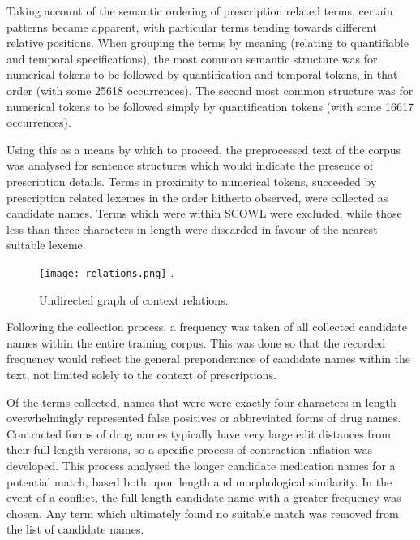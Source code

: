 Taking account of the semantic ordering of prescription related terms, certain patterns became apparent, with particular terms tending towards different relative positions. When grouping the terms by meaning (relating to quantifiable and temporal specifications), the most common semantic structure was for numerical tokens to be followed by quantification and temporal tokens, in that order (with some 25618 occurrences). The second most common structure was for numerical tokens to be followed simply by quantification tokens (with some 16617 occurrences).  

Using this as a means by which to proceed, the preprocessed text of the corpus was analysed for sentence structures which would indicate the presence of prescription details. Terms in proximity to numerical tokens, succeeded by prescription related lexemes in the order hitherto observed, were collected as candidate names. Terms which were within SCOWL were excluded, while those less than three characters in length were discarded in favour of the nearest suitable lexeme. 

\begin{figure}
\centering
\texttt{[image: relations.png]} %
\DeclareGraphicsExtensions.
\caption{Undirected graph of context relations.}
\label{regex}
\end{figure}



Following the collection process, a frequency was taken of all collected candidate names within the entire training corpus. This was done so that the recorded frequency would reflect the general preponderance of candidate names within the text, not limited solely to the context of prescriptions.

Of the terms collected, names that were were exactly four characters in length overwhelmingly represented false positives or abbreviated forms of drug names. Contracted forms of drug names typically have very large edit distances from their full length versions, so a specific process of contraction inflation was developed. This process analysed the longer candidate medication names for a potential match, based both upon length and morphological similarity. In the event of a conflict, the full-length candidate name with a greater frequency was chosen. Any term which ultimately found no suitable match was removed from the list of candidate names.

